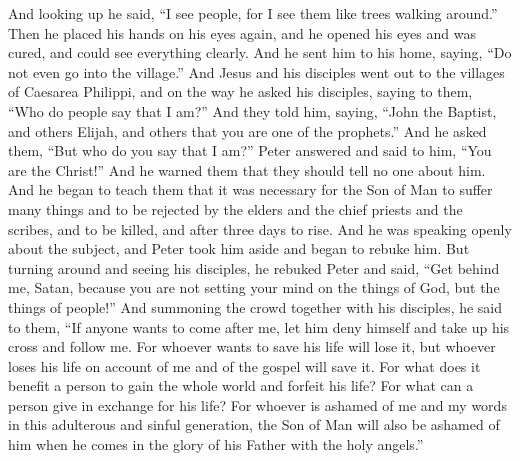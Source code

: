 \begin{biblechapter}
\verse And looking up he said, “I see people, for I see them like trees walking around.”
\verse Then he placed his hands on his eyes again, and he opened his eyes and was cured, and could see everything clearly.
\verse And he sent him to his home, saying, “Do not even go into the village.”
 And Jesus and his disciples went out to the villages of Caesarea Philippi, and on the way he asked his disciples, saying to them, “Who do people say that I am?”
\verse And they told him, saying, “John the Baptist, and others Elijah, and others that you are one of the prophets.”
\verse And he asked them, “But who do you say that I am?” Peter answered and said to him, “You are the Christ!”
\verse And he warned them that they should tell no one about him.
 And he began to teach them that it was necessary for the Son of Man to suffer many things and to be rejected by the elders and the chief priests and the scribes, and to be killed, and after three days to rise.
\verse And he was speaking openly about the subject, and Peter took him aside and began to rebuke him.
\verse But turning around and seeing his disciples, he rebuked Peter and said, “Get behind me, Satan, because you are not setting your mind on the things of God, but the things of people!”
 And summoning the crowd together with his disciples, he said to them, “If anyone wants to come after me, let him deny himself and take up his cross and follow me.
\verse For whoever wants to save his life will lose it, but whoever loses his life on account of me and of the gospel will save it.
\verse For what does it benefit a person to gain the whole world and forfeit his life?
\verse For what can a person give in exchange for his life?
\verse For whoever is ashamed of me and my words in this adulterous and sinful generation, the Son of Man will also be ashamed of him when he comes in the glory of his Father with the holy angels.”
\end{biblechapter}

